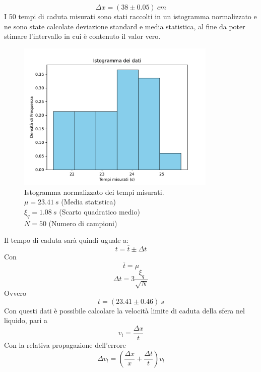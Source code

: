 \documentclass[11pt]{article}
\begin{document}
\begin{equation}
    \Delta x = (38\pm 0.05)\ cm
\end{equation}
I 50 tempi di caduta misurati sono stati raccolti in un istogramma normalizzato e ne sono state calcolate deviazione standard e media statistica, al fine da poter stimare l'intervallo in cui è contenuto il valor vero.
\begin{figure}[H]
  \centering
  \includegraphics[width=0.85\textwidth]{istogramma.pdf}
  \caption{Istogramma normalizzato dei tempi misurati. \\
            $\mu=23.41\ s$ (Media statistica) \\
            $\xi_q=1.08\ s$ (Scarto quadratico medio) \\
            $N=50$ (Numero di campioni)}
\end{figure}
Il tempo di caduta sarà quindi uguale a:
\begin{equation}
    t=\overline{t}\pm \Delta t
\end{equation}
Con
\begin{equation}
    \overline{t} = \mu
\end{equation}
\begin{equation}
    \Delta t= 3\frac{\xi_q}{\sqrt{N}}
\end{equation}
Ovvero
\begin{equation}
    t=(23.41\pm 0.46)\ s
\end{equation}
Con questi dati è possibile calcolare la velocità limite di caduta della sfera nel liquido, pari a
\begin{equation}
    v_l = \frac{\Delta x}{t}
\end{equation}
Con la relativa propagazione dell'errore
\begin{equation}
    \Delta v_l=\left(\frac{\Delta x}{x}+\frac{\Delta t}{t}\right)v_l 
\end{equation}
\end{document}
